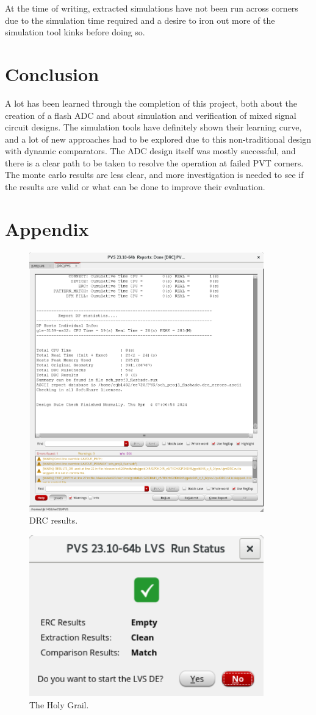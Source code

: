 \documentclass[11pt,letterpaper]{article}
\begin{document}
At the time of writing, extracted simulations have not been run across corners due to the simulation time required and a desire to iron out more of the simulation tool kinks before doing so.

\section{Conclusion}

A lot has been learned through the completion of this project, both about the creation of a flash ADC and about simulation and verification of mixed signal circuit designs. The simulation tools have definitely shown their learning curve, and a lot of new approaches had to be explored due to this non-traditional design with dynamic comparators. The ADC design itself was mostly successful, and there is a clear path to be taken to resolve the operation at failed PVT corners. The monte carlo results are less clear, and more investigation is needed to see if the results are valid or what can be done to improve their evaluation.

\newpage




\newpage
\section*{Appendix}

\begin{figure}[ht!]
    \centering
    \includegraphics[width=4in]{drc.png}
    \caption{DRC results.}\label{fig:drc}
\end{figure}

\begin{figure}[ht!]
    \centering
    \includegraphics[width=4in]{lvs.png}
    \caption{The Holy Grail.}\label{fig:lvs}
\end{figure}
\end{document}
